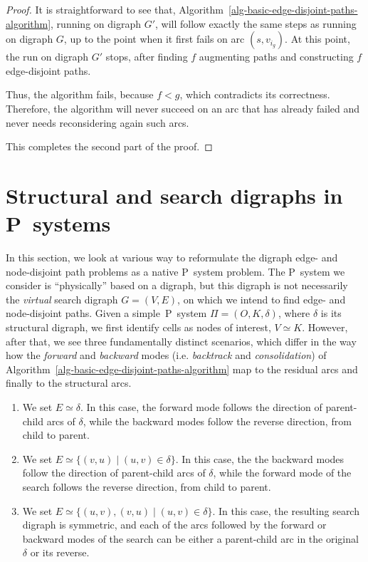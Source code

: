 \documentclass[preliminary,copyright,creativecommons]{eptcs}
\theoremstyle{remark}
\begin{document}
\begin{proof}
It is straightforward to see that, Algorithm~\ref{alg-basic-edge-disjoint-paths-algorithm}, 
running on digraph $G'$, will follow exactly the same steps as running on digraph $G$, 
up to the point when it first fails on arc $(s,v_{i_g})$.
At this point, the run on digraph $G'$ stops, after finding $f$ augmenting paths
and constructing $f$ edge-disjoint paths.

Thus, the algorithm fails, because $f < g$, which contradicts its correctness.
Therefore, the algorithm will never succeed on an arc that has already failed and
never needs reconsidering again such arcs. 

This completes the second part of the proof. 
\end{proof}


\section{Structural and search digraphs in P~systems}
\label{sec-structural-vs-search-digraph}

In this section, we look at various way to reformulate 
the digraph edge- and node-disjoint path problems as a native P~system problem.
The P~system we consider is ``physically'' based on a digraph,
but this digraph is not necessarily the \emph{virtual} search digraph 
$G = (V, E)$, on which we intend to find edge- and node-disjoint paths.
Given a simple~P~system $\Pi = (O, K, \delta)$, where $\delta$ is its structural digraph,
we first identify cells as nodes of interest, $V \simeq K$. 
However, after that, we see three fundamentally distinct scenarios,
which differ in the way how the \emph{forward} and \emph{backward} modes 
(i.e. \emph{backtrack} and \emph{consolidation}) of Algorithm~\ref{alg-basic-edge-disjoint-paths-algorithm} map to the residual arcs and finally to the structural arcs. 

\begin{enumerate}
\item We set $E \simeq \delta$. In this case,
the forward mode follows the direction of parent-child arcs of $\delta$,
while the backward modes follow the reverse direction,
from child to parent.
\item We set $E \simeq \{ (v,u) \mid (u,v) \in \delta \}$. In this case,
the the backward modes follow the direction of parent-child arcs of $\delta$,
while the forward mode of the search follows the reverse direction,
from child to parent.
\item We set $E \simeq \{ (u,v), (v,u) \mid (u,v) \in \delta \}$. In this case,
the resulting search digraph is symmetric, 
and each of the arcs followed by the forward or backward modes of the search
can be either a parent-child arc in the original $\delta$ or its reverse.
\end{enumerate}
\end{document}
